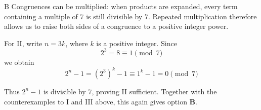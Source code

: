 \documentclass[11pt,a4paper]{article}
\begin{document}
\begin{enumerate}[label=\textbf{\arabic*.},leftmargin=*,itemsep=0pt,start=16]
\begin{djsSolution}{B}
Congruences can be multiplied: when products are expanded, every term containing a multiple of $7$ is still divisible by $7$. Repeated multiplication therefore allows us to raise both sides of a congruence to a positive integer power.

For II, write $n=3k$, where $k$ is a positive integer. Since
\[
2^3=8\equiv1\pmod{7}
\]
we obtain
\[
2^n-1=(2^3)^k-1\equiv1^k-1=0\pmod{7}
\]

Thus $2^n-1$ is divisible by $7$, proving II sufficient. Together with the counterexamples to I and III above, this again gives option \textbf{B}.
\end{djsSolution}
\end{enumerate}
\clearpage
\thispagestyle{djssolutions}
\vspace*{8pt}
\end{document}
